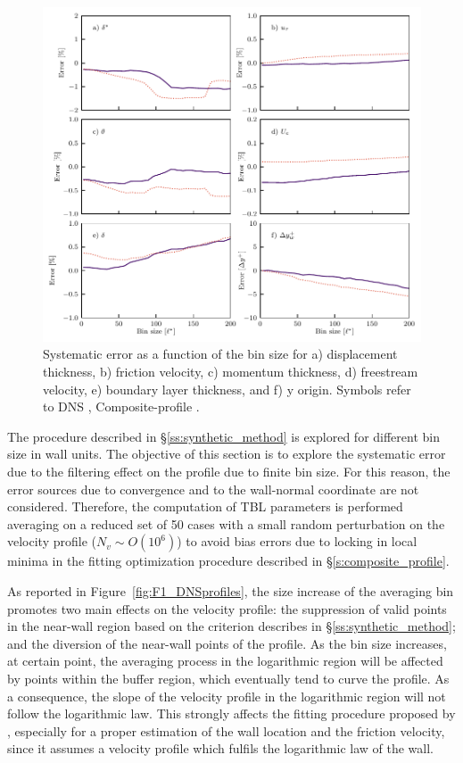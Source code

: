 \begin{figure}
    \centering
    \includegraphics[width=\textwidth]{Figures/figure09.pdf}
    \caption{Systematic error as a function of the bin size for a) displacement thickness, b) friction velocity, c) momentum thickness, d) freestream velocity, e) boundary layer thickness, and f) y origin. Symbols refer to DNS , Composite-profile .}
    \label{fig:systematic_error}
\end{figure}

The procedure described in \S\ref{ss:synthetic_method} is explored {for different bin size in wall units}. {The objective of this section is to explore the systematic error due to the filtering effect on the profile due to finite bin size.} For this reason, the error sources due to convergence and to the wall-normal coordinate are not considered. Therefore, {the computation of TBL parameters} is performed {averaging on} a reduced set of {50} cases with a small random perturbation on the velocity profile ($N_v \sim O(10^6)$) to avoid bias errors due to locking in local minima in the fitting optimization procedure described in \S\ref{s:composite_profile}.

As reported in Figure~\ref{fig:F1_DNSprofiles}, the size increase of the averaging bin promotes two main effects on the velocity profile: the suppression of valid points in the near-wall region based on the criterion describes in \S\ref{ss:synthetic_method}; and the diversion of the near-wall points of the profile. 
As the {bin} size increases, at certain point, the averaging process in the logarithmic region will be affected by points within the buffer region, which eventually tend to curve the profile. As a consequence, the slope of the velocity profile in the logarithmic region will not follow the logarithmic law. This strongly affects the fitting procedure proposed by \citet{Chauhan:2009p10824}, especially for a proper estimation of the wall location and the friction velocity, since it assumes a velocity profile which fulfils the logarithmic law of the wall.

